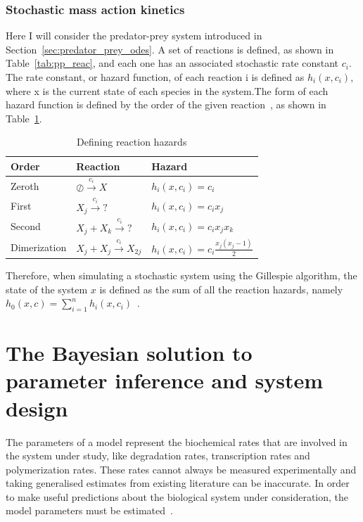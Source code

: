 \subsubsection{Stochastic mass action kinetics}
Here I will consider the predator-prey system introduced in Section~\ref{sec:predator_prey_odes}. A set of reactions is defined, as shown in Table~\ref{tab:pp_reac}, and each one has an associated stochastic rate constant $c_i$. The rate constant, or hazard function, of each reaction i is defined as $h_i(x, c_i)$, where x is the current state of each species in the system.The form of each hazard function is defined by the order of the given reaction~\autocite{Wilkinson:2006td}, as shown in Table~\ref{tab:hazards}. 


\begin{table}[h]
\centering
\caption{Defining reaction hazards}
\label{tab:hazards}
\begin{tabular}{@{}lll@{}}
\toprule
Order & Reaction & Hazard \\ \midrule
Zeroth & $\oslash \xrightarrow{c_i}X $ & $h_i(x, c_i) = c_i$ \\
First & $X_j \xrightarrow{c_i} ? $ & $h_i(x, c_i) = c_{i}x_j$ \\
Second & $X_j + X_k \xrightarrow{c_i} ? $ & $h_i(x, c_i) = c_{i}x_{j}x_k$ \\
Dimerization & $X_j + X_j \xrightarrow{c_i} X_{2j} $ & $h_i(x, c_i) = c_{i}\frac{x_{j}(x_{j}-1)}{2}$ \\ \bottomrule
\end{tabular}
\end{table}

\noindent Therefore, when simulating a stochastic system using the Gillespie algorithm, the state of the system $x$ is defined as the sum of all the reaction hazards, namely $h_0(x, c) = \sum_{i=1}^{n}h_{i}(x, c_i)$~\autocite{Wilkinson:2006td}. 

\section{The Bayesian solution to parameter inference and system design}

The parameters of a model represent the biochemical rates that are involved in the system under study, like degradation rates, transcription rates and polymerization rates. These rates cannot always be measured experimentally and taking generalised estimates from existing literature can be inaccurate. In order to make useful predictions about the biological system under consideration, the model parameters must be estimated~\autocite{Zheng:2010bp}. 

